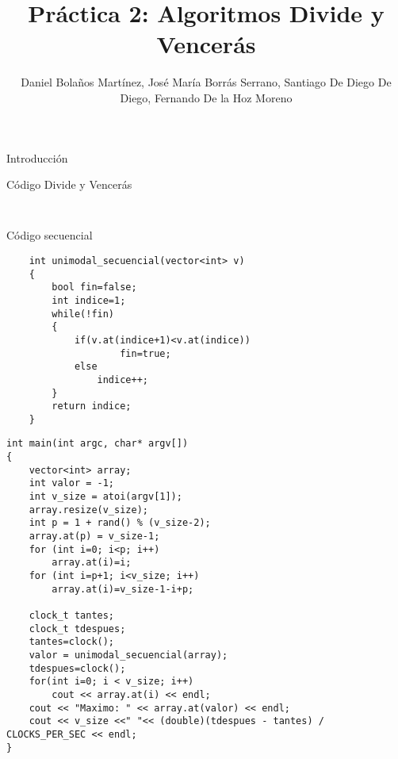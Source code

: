 \documentclass[12pt]{beamer}
\author{Daniel Bolaños Martínez, José María Borrás Serrano, Santiago De Diego De Diego, Fernando De la Hoz Moreno}
\title{Práctica 2: Algoritmos Divide y Vencerás}
\institute{ETSIIT}
\date{}
\begin{document}
\begin{frame}
\titlepage
\end{frame}

\begin{frame}
\tableofcontents
\end{frame}

\begin{frame}{Introducción}

\end{frame}

\begin{frame}[fragile]{Código Divide y Vencerás}
	\begin{lstlisting}
	
	\end{lstlisting}
\end{frame}

\begin{frame}[fragile]{Código secuencial}
	\begin{lstlisting}
	int unimodal_secuencial(vector<int> v)
	{
  		bool fin=false;
  		int indice=1;
  		while(!fin)
  		{
   	 		if(v.at(indice+1)<v.at(indice))
        			fin=true;
     		else
        		indice++;
  		}
 	 	return indice;
	}
	\end{lstlisting}
\end{frame}
\begin{frame}[fragile]
	\begin{lstlisting}
int main(int argc, char* argv[])
{
  	vector<int> array;
  	int valor = -1;
  	int v_size = atoi(argv[1]);
  	array.resize(v_size);
    int p = 1 + rand() % (v_size-2);
    array.at(p) = v_size-1;
    for (int i=0; i<p; i++) 
        array.at(i)=i;
    for (int i=p+1; i<v_size; i++) 
        array.at(i)=v_size-1-i+p;

  	clock_t tantes;
  	clock_t tdespues;
  	tantes=clock();
  	valor = unimodal_secuencial(array);
 	tdespues=clock();
  	for(int i=0; i < v_size; i++)
     	cout << array.at(i) << endl;
    cout << "Maximo: " << array.at(valor) << endl;
	cout << v_size <<" "<< (double)(tdespues - tantes) / CLOCKS_PER_SEC << endl;
}
	\end{lstlisting}

\end{frame}
\end{document}
